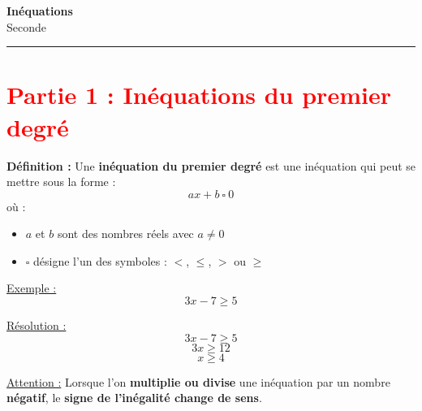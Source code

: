 \documentclass[12pt]{article}
\begin{document}

\newpage

\begin{center}
    {\LARGE \textbf{Inéquations}}\\[4mm]
    {\large Seconde}
\end{center}

\hrule
\vspace{0.4cm}


\section*{\textcolor{red}{Partie 1 : Inéquations du premier degré}}

\vspace{5pt}

\begin{mdframed}[
    linewidth=1pt,
    linecolor=ForestGreen,
    innertopmargin=10pt,
    innerbottommargin=10pt
]
{\color{ForestGreen}\textbf{Définition :}}  
Une \textbf{inéquation du premier degré} est une inéquation qui peut se mettre sous la forme :
\[
ax + b \ \square \ 0
\]
où :
\begin{itemize}
    \item $a$ et $b$ sont des nombres réels avec $a \neq 0$
    \item $\square$ désigne l'un des symboles : $<$, $\le$, $>$ ou $\ge$
\end{itemize}
\end{mdframed}

\vspace{10pt}

\underline{Exemple :}
\[
3x - 7 \ge 5
\]

\vspace{5pt}

\underline{Résolution :}
\[
3x - 7 \ge 5
\]
\[
3x \ge 12
\]
\[
x \ge 4
\]

\vspace{10pt}

\begin{mdframed}[
    linewidth=1pt,
    linecolor=Red,
    innertopmargin=10pt,
    innerbottommargin=10pt
]
{\color{red}
\underline{Attention :}
Lorsque l'on \textbf{multiplie ou divise} une inéquation par un nombre \textbf{négatif},  
le \textbf{signe de l'inégalité change de sens}.
}
\end{mdframed}
\end{document}
